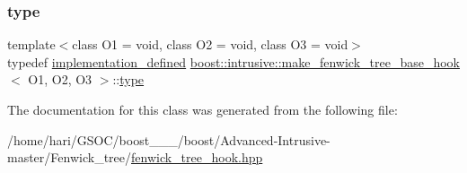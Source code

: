 \mbox{\label{classboost_1_1intrusive_1_1make__fenwick__tree__base__hook_ac194b5544afb5fb14dca7765784c8eb7}} 
\subsubsection{\texorpdfstring{type}{type}}
{\footnotesize\ttfamily template$<$class O1 = void, class O2 = void, class O3 = void$>$ \\
typedef \hyperlink{classboost_1_1intrusive_1_1make__fenwick__tree__base__hook_af661b0546c575716fb1fc71c0446929c}{implementation\+\_\+defined} \hyperlink{classboost_1_1intrusive_1_1make__fenwick__tree__base__hook}{boost\+::intrusive\+::make\+\_\+fenwick\+\_\+tree\+\_\+base\+\_\+hook}$<$ O1, O2, O3 $>$\+::\hyperlink{classboost_1_1intrusive_1_1make__fenwick__tree__base__hook_ac194b5544afb5fb14dca7765784c8eb7}{type}}



The documentation for this class was generated from the following file\+:\begin{DoxyCompactItemize}
\item 
/home/hari/\+G\+S\+O\+C/boost\+\_\+\_\+\_/boost/\+Advanced-\/\+Intrusive-\/master/\+Fenwick\+\_\+tree/\hyperlink{fenwick__tree__hook_8hpp}{fenwick\+\_\+tree\+\_\+hook.\+hpp}\end{DoxyCompactItemize}
